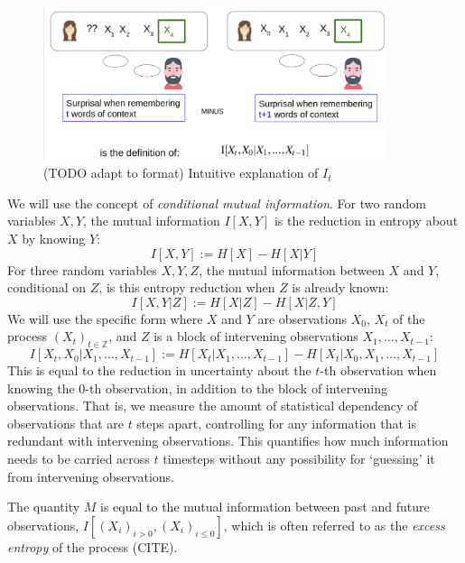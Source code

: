 \documentclass[11pt,letterpaper]{article}
\begin{document}
\begin{figure}
\includegraphics[width=0.9\textwidth]{figures/listener-it.png}
	\caption{(TODO adapt to format) Intuitive explanation of $I_t$}
\end{figure}








We will use the concept of \emph{conditional mutual information}.
For two random variables $X, Y$, the mutual information $I[X,Y]$ is the reduction in entropy about $X$ by knowing $Y$:
\begin{equation}
	I[X,Y] := H[X] - H[X|Y]
\end{equation}
For three random variables $X, Y, Z$, the mutual information between $X$ and $Y$, conditional on $Z$, is this entropy reduction when $Z$ is already known:
\begin{equation}
I[X,Y|Z] := H[X|Z] - H[X|Z,Y]
\end{equation}
We will use the specific form where $X$ and $Y$ are observations $X_0$, $X_t$ of the process $(X_t)_{t \in \mathbb{Z}}$, and $Z$ is a block of intervening observations $X_1, \dots, X_{t-1}$:
\begin{equation}
	I[X_t, X_0 | X_1, \dots, X_{t-1}] := H[X_t| X_1, \dots, X_{t-1}] - H[X_t| X_0, X_1, \dots, X_{t-1}]
\end{equation}
This is equal to the reduction in uncertainty about the $t$-th observation when knowing the $0$-th observation, in addition to the block of intervening observations.
That is, we measure the amount of statistical dependency of observations that are $t$ steps apart, controlling for any information that is redundant with intervening observations.
This quantifies how much information needs to be carried across $t$ timesteps without any possibility for `guessing' it from intervening observations.



The quantity $M$ is equal to the mutual information between past and future observations, $I[(X_i)_{i>0}, (X_i)_{i \leq 0}]$, which is often referred to as the \emph{excess entropy} of the process (CITE).
\end{document}
